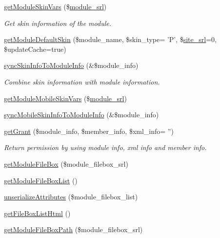 \begin{DoxyCompactItemize}
\hyperlink{classmoduleModel_aa3828c94af2b1c8b84fafd423038445d}{get\-Module\-Skin\-Vars} (\$\hyperlink{ko_8install_8php_a370bb6450fab1da3e0ed9f484a38b761}{module\-\_\-srl})
\begin{DoxyCompactList}\small\item\em Get skin information of the module. \end{DoxyCompactList}\item 
\hyperlink{classmoduleModel_a0a77bcbc85aa39eebe18687ab6e0b974}{get\-Module\-Default\-Skin} (\$module\-\_\-name, \$skin\-\_\-type= 'P', \$\hyperlink{ko_8install_8php_a8b1406b4ad1048041558dce6bfe89004}{site\-\_\-srl}=0, \$update\-Cache=true)
\item 
\hyperlink{classmoduleModel_af9179765de4796b45236b62be16eb8fb}{sync\-Skin\-Info\-To\-Module\-Info} (\&\$module\-\_\-info)
\begin{DoxyCompactList}\small\item\em Combine skin information with module information. \end{DoxyCompactList}\item 
\hyperlink{classmoduleModel_aef7f4760b4c1864752d1042e1a0667c8}{get\-Module\-Mobile\-Skin\-Vars} (\$\hyperlink{ko_8install_8php_a370bb6450fab1da3e0ed9f484a38b761}{module\-\_\-srl})
\item 
\hyperlink{classmoduleModel_ae90cd832480cf8c46e96d95c20a63387}{sync\-Mobile\-Skin\-Info\-To\-Module\-Info} (\&\$module\-\_\-info)
\item 
\hyperlink{classmoduleModel_a0d6431efeb3e3d377dbbb20b414ba074}{get\-Grant} (\$module\-\_\-info, \$member\-\_\-info, \$xml\-\_\-info= '')
\begin{DoxyCompactList}\small\item\em Return permission by using module info, xml info and member info. \end{DoxyCompactList}\item 
\hyperlink{classmoduleModel_a792e14b71d66044513a646a44216be17}{get\-Module\-File\-Box} (\$module\-\_\-filebox\-\_\-srl)
\item 
\hyperlink{classmoduleModel_a8f3a098b40649594a591e5ea8bd15d96}{get\-Module\-File\-Box\-List} ()
\item 
\hyperlink{classmoduleModel_a60ec88f0d61e7a44887bebba8048a18d}{unserialize\-Attributes} (\$module\-\_\-filebox\-\_\-list)
\item 
\hyperlink{classmoduleModel_acf3405bfe791d8bf7d8e7886b9481923}{get\-File\-Box\-List\-Html} ()
\item 
\hyperlink{classmoduleModel_ac1183d568d6dab443a83c8618e6eb348}{get\-Module\-File\-Box\-Path} (\$module\-\_\-filebox\-\_\-srl)

\end{DoxyCompactItemize}
